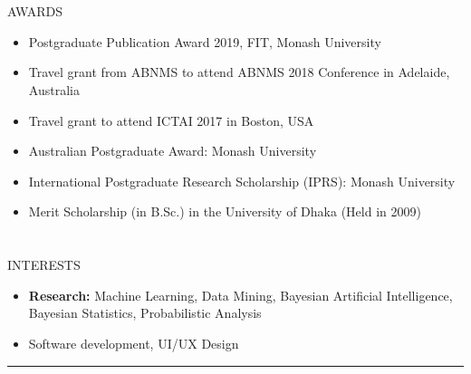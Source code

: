 \documentclass{my_cv}
\begin{document}
\section{\faTrophy}{AWARDS}
\begin{itemize}[noitemsep]
    \item Postgraduate Publication Award 2019, FIT, Monash University
    \item Travel grant from ABNMS to attend ABNMS 2018 Conference in Adelaide, Australia
    \item Travel grant to attend ICTAI 2017 in Boston, USA
    \item Australian Postgraduate Award: Monash University
    \item International Postgraduate Research Scholarship (IPRS): Monash University 
    \item Merit Scholarship (in B.Sc.) in the University of Dhaka (Held in 2009) 
\end{itemize}

\section{\faSoccerBallO}{INTERESTS}

\begin{itemize}[noitemsep]
    \item \textbf{Research:} Machine Learning, Data Mining, Bayesian Artificial Intelligence, Bayesian Statistics, Probabilistic Analysis 
    \item Software development, UI/UX Design
\end{itemize}


\noindent\rule{18.75cm}{0.6pt}
\vspace{20pt}
\end{document}
